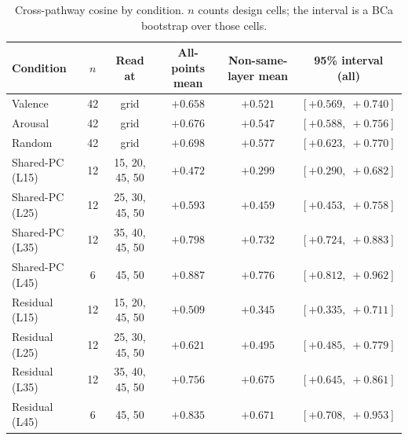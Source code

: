 \documentclass[11pt,a4paper]{article}
\begin{document}
\begin{table}[htbp]
\centering
\caption{Cross-pathway cosine by condition. $n$ counts design cells; the interval is a BCa bootstrap over those cells.}
\label{tab:coupling}
{\small
\begin{tabular}{@{}lccccc@{}}
\toprule
Condition & $n$ & Read at & All-points mean & Non-same-layer mean & 95\% interval (all) \\
\midrule
Valence      & 42 & grid & $+0.658$ & $+0.521$ & $[+0.569,\; +0.740]$ \\
Arousal      & 42 & grid & $+0.676$ & $+0.547$ & $[+0.588,\; +0.756]$ \\
Random       & 42 & grid & $+0.698$ & $+0.577$ & $[+0.623,\; +0.770]$ \\
Shared-PC (L15) & 12 & 15, 20, 45, 50 & $+0.472$ & $+0.299$ & $[+0.290,\; +0.682]$ \\
Shared-PC (L25) & 12 & 25, 30, 45, 50 & $+0.593$ & $+0.459$ & $[+0.453,\; +0.758]$ \\
Shared-PC (L35) & 12 & 35, 40, 45, 50 & $+0.798$ & $+0.732$ & $[+0.724,\; +0.883]$ \\
Shared-PC (L45) & 6  & 45, 50 & $+0.887$ & $+0.776$ & $[+0.812,\; +0.962]$ \\
Residual (L15)  & 12 & 15, 20, 45, 50 & $+0.509$ & $+0.345$ & $[+0.335,\; +0.711]$ \\
Residual (L25)  & 12 & 25, 30, 45, 50 & $+0.621$ & $+0.495$ & $[+0.485,\; +0.779]$ \\
Residual (L35)  & 12 & 35, 40, 45, 50 & $+0.756$ & $+0.675$ & $[+0.645,\; +0.861]$ \\
Residual (L45)  & 6  & 45, 50 & $+0.835$ & $+0.671$ & $[+0.708,\; +0.953]$ \\
\bottomrule
\end{tabular}
}

\smallskip
{}
\end{table}
\end{document}
